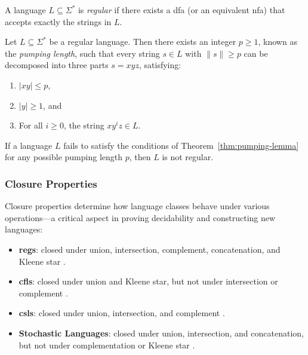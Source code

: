 \begin{definition}
A language $L \subseteq \Sigma^\ast$ is \textit{regular} if there exists a \gls{dfa} (or an equivalent \gls{nfa}) that accepts exactly the strings in $L$.
\end{definition}

\begin{theorem}
\label{thm:pumping-lemma}
Let $L \subseteq \Sigma^\ast$ be a regular language. Then there exists an integer $p \geq 1$, known as the \textit{pumping length}, such that every string $s \in L$ with $\|s\| \geq p$ can be decomposed into three parts $s = xyz$, satisfying:
\begin{enumerate}
    \item $|xy| \leq p$,
    \item $|y| \geq 1$, and
    \item For all $i \geq 0$, the string $xy^iz \in L$.
\end{enumerate}
\end{theorem}

\begin{corollary}
If a language $L$ fails to satisfy the conditions of Theorem~\ref{thm:pumping-lemma} for any possible pumping length $p$, then $L$ is not regular.
\end{corollary}

\subsubsection{Closure Properties}
Closure properties determine how language classes behave under various operations—a critical aspect in proving decidability and constructing new languages:

\begin{itemize}
    \item \textbf{\glspl{reg}}: closed under union, intersection, complement, concatenation, and Kleene star \cite{hopcroft2006introduction}.
    \item \textbf{\glspl{cfl}}: closed under union and Kleene star, but not under intersection or complement \cite{chomsky1956three, hopcroft2006introduction}.
    \item \textbf{\glspl{csl}}: closed under union, intersection, and complement \cite{chomsky1956three, hopcroft2006introduction}.
    \item \textbf{Stochastic Languages}: closed under union, intersection, and concatenation, but not under complementation or Kleene star \cite{rabin1963probabilistic, paz1971introduction}.
\end{itemize}

